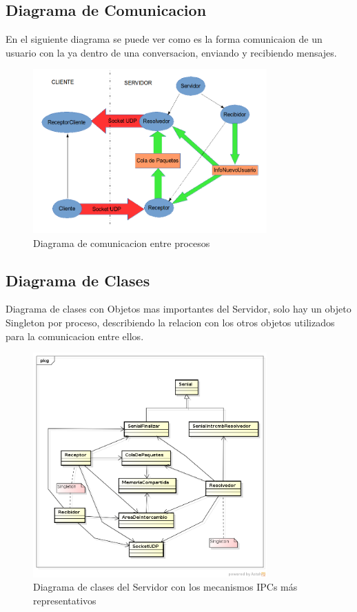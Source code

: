 \documentclass[a4paper,12pt,titlepage]{article}
\begin{document}
\subsection{Diagrama de Comunicacion}
En el siguiente diagrama se puede ver como es la forma comunicaion de un usuario con la ya dentro de una conversacion, enviando y recibiendo mensajes.
\begin{figure}[h!]
\centering
\includegraphics[width=0.8\textwidth]{dia_comunicacion.png}
\caption{Diagrama de comunicacion entre procesos}
\label{fig:comunicacion}
\end{figure}

\newpage
\subsection{Diagrama de Clases}
Diagrama de clases con Objetos mas importantes del Servidor, solo hay un objeto Singleton por proceso, describiendo la relacion con los otros objetos utilizados para la comunicacion entre ellos. 
\begin{figure}[h!]
\centering
\includegraphics[width=0.8\textwidth]{dia_clases-servidor.png}
\caption{Diagrama de clases del Servidor con los mecanismos IPCs más representativos}
\label{fig:clases}
\end{figure}
\end{document}
